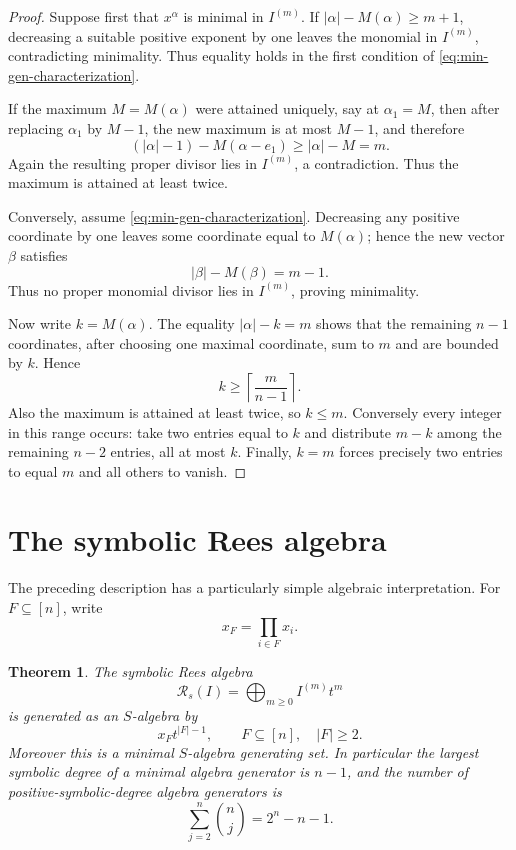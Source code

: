 \documentclass[11pt]{article}
\newtheorem{theorem}{Theorem}[section]
\newcommand{\Rss}{\mathcal R_s}
\begin{document}
\begin{proof}
Suppose first that \(x^\alpha\) is minimal in \(I^{(m)}\).  If
\(|\alpha|-M(\alpha)\ge m+1\), decreasing a suitable positive exponent
by one leaves the monomial in \(I^{(m)}\), contradicting minimality.
Thus equality holds in the first condition of
\eqref{eq:min-gen-characterization}.

If the maximum \(M=M(\alpha)\) were attained uniquely, say at
\(\alpha_1=M\), then after replacing \(\alpha_1\) by \(M-1\), the new
maximum is at most \(M-1\), and therefore
\[
 (|\alpha|-1)-M(\alpha-e_1)\ge |\alpha|-M=m.
\]
Again the resulting proper divisor lies in \(I^{(m)}\), a
contradiction.  Thus the maximum is attained at least twice.

Conversely, assume \eqref{eq:min-gen-characterization}.  Decreasing any
positive coordinate by one leaves some coordinate equal to
\(M(\alpha)\); hence the new vector \(\beta\) satisfies
\[
 |\beta|-M(\beta)=m-1.
\]
Thus no proper monomial divisor lies in \(I^{(m)}\), proving
minimality.

Now write \(k=M(\alpha)\).  The equality
\(|\alpha|-k=m\) shows that the remaining \(n-1\) coordinates,
after choosing one maximal coordinate, sum to \(m\) and are bounded
by \(k\).  Hence
\[
 k\ge\left\lceil\frac{m}{n-1}\right\rceil.
\]
Also the maximum is attained at least twice, so \(k\le m\).
Conversely every integer in this range occurs: take two entries equal
to \(k\) and distribute \(m-k\) among the remaining \(n-2\) entries,
all at most \(k\).  Finally, \(k=m\) forces precisely two entries to
equal \(m\) and all others to vanish.
\end{proof}


\section{The symbolic Rees algebra}

The preceding description has a particularly simple algebraic
interpretation.  For \(F\subseteq[n]\), write
\[
 x_F=\prod_{i\in F}x_i.
\]

\begin{theorem}\label{thm:symbolic-rees}
The symbolic Rees algebra
\[
 \Rss(I)=\bigoplus_{m\ge0} I^{(m)}t^m
\]
is generated as an \(S\)-algebra by
\[
 x_Ft^{|F|-1},
 \qquad
 F\subseteq[n],\quad |F|\ge2.
\]
Moreover this is a minimal \(S\)-algebra generating set.  In
particular the largest symbolic degree of a minimal algebra generator
is \(n-1\), and the number of positive-symbolic-degree algebra
generators is
\[
 \sum_{j=2}^n\binom nj=2^n-n-1.
\]
\end{theorem}
\end{document}
